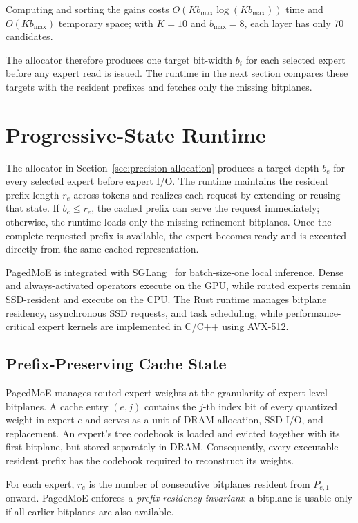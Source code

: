 \documentclass[sigconf, nonacm]{acmart}
\begin{document}
Computing and sorting the gains costs
\(O(Kb_{\max}\log(Kb_{\max}))\) time and \(O(Kb_{\max})\) temporary space;
with \(K=10\) and \(b_{\max}=8\), each layer has only 70 candidates.

The allocator therefore produces one target bit-width \(b_i\) for each
selected expert before any expert read is issued. The runtime in the next
section compares these targets with the resident prefixes and fetches only
the missing bitplanes.

\section{Progressive-State Runtime}
\label{sec:runtime}

The allocator in Section~\ref{sec:precision-allocation} produces a
target depth \(b_e\) for every selected expert before expert I/O.
The runtime maintains the resident prefix length \(r_e\) across tokens
and realizes each request by extending or reusing that state. If
\(b_e\leq r_e\), the cached prefix can serve the request immediately;
otherwise, the runtime loads only the missing refinement bitplanes.
Once the complete requested prefix is available, the expert becomes
ready and is executed directly from the same cached representation.

PagedMoE is integrated with SGLang~\cite{sglang} for batch-size-one
local inference.
Dense and always-activated operators execute on the GPU, while routed
experts remain SSD-resident and execute on the CPU. The Rust runtime
manages bitplane residency, asynchronous SSD requests, and task
scheduling, while performance-critical expert kernels are implemented
in C/C++ using AVX-512.

\subsection{Prefix-Preserving Cache State}
\label{sec:bitplane-cache}

PagedMoE manages routed-expert weights at the granularity of expert-level bitplanes. A cache entry \((e,j)\) contains the \(j\)-th index bit of every quantized weight in expert \(e\) and serves as a unit of DRAM allocation, SSD I/O, and replacement. An expert's tree codebook is loaded and evicted together with its first bitplane, but stored separately in DRAM. Consequently, every executable resident prefix has the codebook required to reconstruct its weights.

For each expert, \(r_e\) is the number of consecutive bitplanes resident from \(P_{e,1}\) onward. PagedMoE enforces a \emph{prefix-residency invariant}: a bitplane is usable only if all earlier bitplanes are also available.
\end{document}
